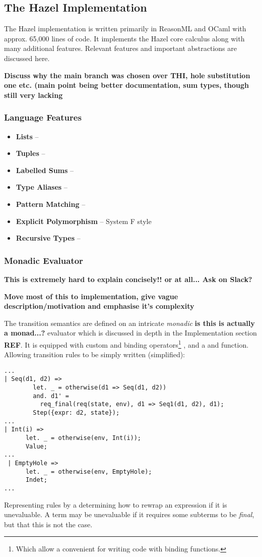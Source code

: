 \subsection{The Hazel Implementation}\label{sec:HazelImplementation}
The Hazel implementation \cite{HazelCode} is written primarily in ReasonML and OCaml with approx. 65,000 lines of code. It implements the Hazel core calculus along with many additional features. Relevant features and important abstractions are discussed here.

\textbf{Discuss why the main branch was chosen over THI, hole substitution one etc. (main point being better documentation, sum types, though still very lacking}

\subsubsection{Language Features}\label{sec:HazelAdditionalFeatures}
\begin{itemize}
\item \textbf{Lists} -- 
\item \textbf{Tuples} -- 
\item \textbf{Labelled Sums} -- 
\item \textbf{Type Aliases} -- 
\item \textbf{Pattern Matching} -- 
\item \textbf{Explicit Polymorphism} -- System F style
\item \textbf{Recursive Types} -- 
\end{itemize}

\subsubsection{Monadic Evaluator}\label{sec:HazelEvaluator}
\textbf{This is extremely hard to explain concisely!! or at all... Ask on Slack?}

\textbf{Move most of this to implementation, give vague description/motivation and emphasise it's complexity}

The transition semantics are defined on an intricate \textit{monadic} \textbf{is this is actually a monad...?} evaluator which is discussed in depth in the Implementation section \textbf{REF}. It is equipped with custom  and  binding operators\footnote{Which allow a convenient for writing code with binding functions.} \cite{OCamlManual}, and a  and  function. Allowing transition rules to be simply written (simplified):
\begin{verbatim}
...
| Seq(d1, d2) =>
        let. _ = otherwise(d1 => Seq(d1, d2))
        and. d1' = 
          req_final(req(state, env), d1 => Seq1(d1, d2), d1);
        Step({expr: d2, state});
...
| Int(i) =>
      let. _ = otherwise(env, Int(i));
      Value;
...
 | EmptyHole =>
      let. _ = otherwise(env, EmptyHole);
      Indet;
...
\end{verbatim}
Representing rules by a  determining how to rewrap an expression if it is unevaluable. A term may be unevaluable if it requires some subterms to be \textit{final}, but that this is not the case. 

